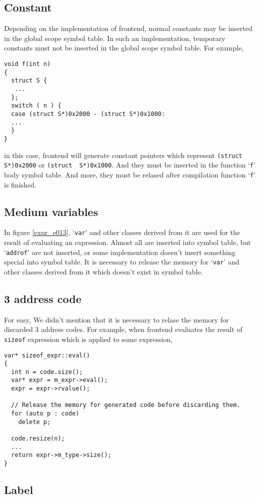 \subsection{Constant}

Depending on the implementation of frontend,
normal constants may be inserted in the global scope symbol table.
In such an implementation, temporary constants must not be
inserted in the global scope symbol table. For example,
\begin{verbatim}
void f(int n)
{
  struct S {
   ...
  };
  switch ( n ) {
  case (struct S*)0x2000 - (struct S*)0x1000:
  ...
  }
}
\end{verbatim}
in this case, frontend will generate constant pointers
which represent {\tt{(struct\,\,S*)0x2000}} or
{\tt{(struct\,\,S*)0x1000}}. And they must be
inserted in the function `{\tt{f}}' body symbol table.
And more, they must be relased after compilation function `{\tt{f}}'
is finished.

\subsection{Medium variables}

In figure \ref{expr_e013}, `{\tt{var}}' and other classes derived
from it are used for the result of evaluating an expression.
Almost all are inserted into symbol table, but 
`{\tt{addrof}}' are not inserted, or some implementation
doesn't insert something special into symbol table.
It is necessary to release the memory for
`{\tt{var}}' and other classes derived from it which doesn't exist
in symbol table.

\subsection{3 address code}
\label{speed3ac_e}
For easy, We didn't mention that
it is necessary to relase the memory for discarded
3 address codes. For example, when frontend
evaluates the result of {\tt{sizeof}} expression
which is applied to some expression,
\begin{verbatim}
var* sizeof_expr::eval()
{
  int n = code.size();
  var* expr = m_expr->eval();
  expr = expr->rvalue();

  // Release the memory for generated code before discarding them.
  for (auto p : code)
    delete p;

  code.resize(n);
  ...
  return expr->m_type->size();
}
\end{verbatim}
\subsection{Label}

